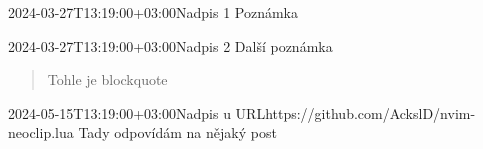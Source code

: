 \documentclass{article}
\begin{document}
\begin{note}{2024-03-27T13:19:00+03:00}{Nadpis 1}
  Poznámka
\end{note}

\begin{note}{2024-03-27T13:19:00+03:00}{Nadpis 2}
  Další poznámka
  \begin{quote}
    Tohle je blockquote
  \end{quote}
\end{note}

\begin{reply}{2024-05-15T13:19:00+03:00}{Nadpis u URL}{https://github.com/AckslD/nvim-neoclip.lua}
   Tady odpovídám na nějaký post
\end{reply}

\end{document}
